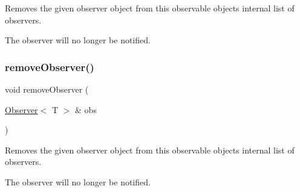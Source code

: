 Removes the given observer object from this observable object\textquotesingle{}s internal list of observers. 

The observer will no longer be notified. \mbox{\label{classObservable_a36b9c4607c1cab08dc800daa5aa38b82}} 
\subsubsection{\texorpdfstring{remove\+Observer()}{removeObserver()}\hspace{0.1cm}{\footnotesize\ttfamily [2/2]}}
{\footnotesize\ttfamily void remove\+Observer (\begin{DoxyParamCaption}\item[{\mbox{\hyperlink{classObserver}{Observer}}$<$ T $>$ \&}]{obs }\end{DoxyParamCaption})}



Removes the given observer object from this observable object\textquotesingle{}s internal list of observers. 

The observer will no longer be notified. 